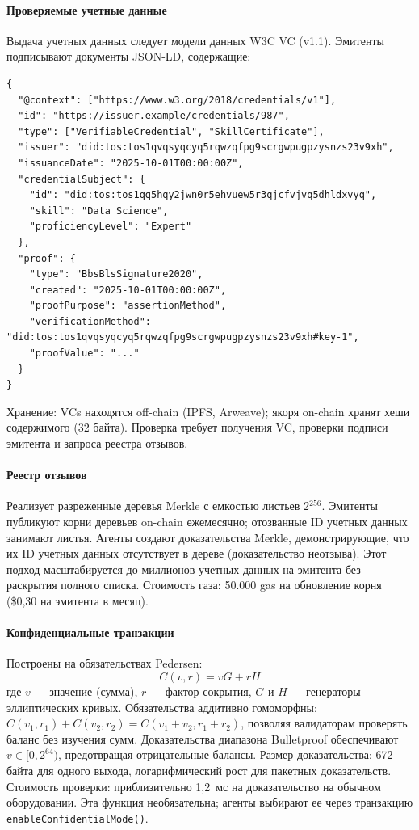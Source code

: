 \documentclass[11pt]{article}
\begin{document}
\paragraph{Проверяемые учетные данные} Выдача учетных данных следует модели данных W3C VC (v1.1). Эмитенты подписывают документы JSON-LD, содержащие:
\begin{verbatim}
{
  "@context": ["https://www.w3.org/2018/credentials/v1"],
  "id": "https://issuer.example/credentials/987",
  "type": ["VerifiableCredential", "SkillCertificate"],
  "issuer": "did:tos:tos1qvqsyqcyq5rqwzqfpg9scrgwpugpzysnzs23v9xh",
  "issuanceDate": "2025-10-01T00:00:00Z",
  "credentialSubject": {
    "id": "did:tos:tos1qq5hqy2jwn0r5ehvuew5r3qjcfvjvq5dhldxvyq",
    "skill": "Data Science",
    "proficiencyLevel": "Expert"
  },
  "proof": {
    "type": "BbsBlsSignature2020",
    "created": "2025-10-01T00:00:00Z",
    "proofPurpose": "assertionMethod",
    "verificationMethod": "did:tos:tos1qvqsyqcyq5rqwzqfpg9scrgwpugpzysnzs23v9xh#key-1",
    "proofValue": "..."
  }
}
\end{verbatim}
Хранение: VCs находятся off-chain (IPFS, Arweave); якоря on-chain хранят хеши содержимого (32 байта). Проверка требует получения VC, проверки подписи эмитента и запроса реестра отзывов.

\paragraph{Реестр отзывов} Реализует разреженные деревья Merkle с емкостью листьев 2$^{256}$. Эмитенты публикуют корни деревьев on-chain ежемесячно; отозванные ID учетных данных занимают листья. Агенты создают доказательства Merkle, демонстрирующие, что их ID учетных данных отсутствует в дереве (доказательство неотзыва). Этот подход масштабируется до миллионов учетных данных на эмитента без раскрытия полного списка. Стоимость газа: 50.000 gas на обновление корня (\$0,30 на эмитента в месяц).

\paragraph{Конфиденциальные транзакции} Построены на обязательствах Pedersen:
\begin{equation}
C(v, r) = vG + rH
\end{equation}
где $v$ — значение (сумма), $r$ — фактор сокрытия, $G$ и $H$ — генераторы эллиптических кривых. Обязательства аддитивно гомоморфны: $C(v_1, r_1) + C(v_2, r_2) = C(v_1 + v_2, r_1 + r_2)$, позволяя валидаторам проверять баланс без изучения сумм. Доказательства диапазона Bulletproof обеспечивают $v \in [0, 2^{64})$, предотвращая отрицательные балансы. Размер доказательства: 672 байта для одного выхода, логарифмический рост для пакетных доказательств. Стоимость проверки: приблизительно 1,2~мс на доказательство на обычном оборудовании. Эта функция необязательна; агенты выбирают ее через транзакцию \texttt{enableConfidentialMode()}.
\end{document}
